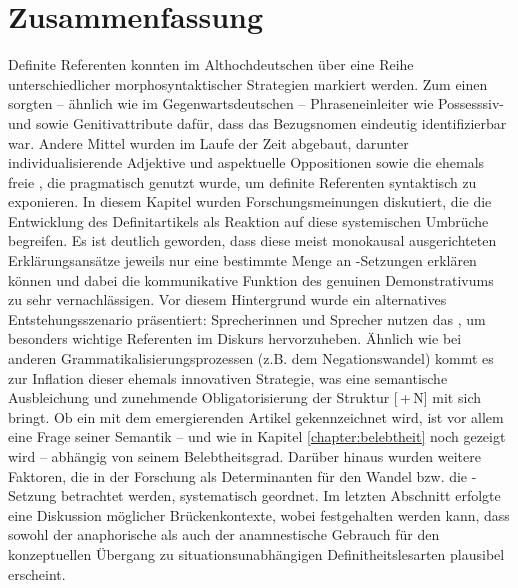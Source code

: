 \section{Zusammenfassung}
Definite Referenten konnten im Althochdeutschen über eine Reihe unterschiedlicher morphosyntaktischer Strategien markiert werden. Zum einen sorgten -- ähnlich wie im Gegenwartsdeutschen -- Phraseneinleiter wie Possesssiv-  und  sowie Genitivattribute  dafür, dass das Bezugsnomen eindeutig identifizierbar war. Andere Mittel wurden im Laufe der Zeit abgebaut, darunter individualisierende Adjektive  und aspektuelle  Oppositionen sowie die ehemals freie , die pragmatisch genutzt wurde, um definite Referenten syntaktisch zu exponieren. In diesem Kapitel wurden Forschungsmeinungen diskutiert, die die Entwicklung des Definitartikels  als Reaktion auf diese systemischen Umbrüche begreifen. Es ist deutlich geworden, dass diese meist monokausal ausgerichteten Erklärungsansätze jeweils nur eine bestimmte Menge an -Setzungen erklären können und dabei die kommunikative Funktion des genuinen Demonstrativums  zu sehr vernachlässigen. Vor diesem Hintergrund wurde ein alternatives Entstehungsszenario präsentiert: Sprecherinnen und Sprecher nutzen das , um besonders wichtige Referenten im Diskurs hervorzuheben. Ähnlich wie bei anderen Grammatikalisierungsprozessen  (z.B. dem Negationswandel) kommt es zur Inflation dieser ehemals innovativen Strategie, was eine semantische Ausbleichung und zunehmende Obligatorisierung der Struktur [\,+\,N] mit sich bringt. Ob ein  mit dem emergierenden Artikel gekennzeichnet wird, ist vor allem eine Frage seiner Semantik -- und wie in Kapitel \ref{chapter:belebtheit} noch gezeigt wird -- abhängig von seinem  Belebtheitsgrad. Darüber hinaus wurden weitere Faktoren, die in der Forschung als Determinanten für den Wandel bzw. die -Setzung betrachtet werden, systematisch geordnet. Im letzten Abschnitt erfolgte eine Diskussion möglicher  Brückenkontexte, wobei festgehalten werden kann, dass sowohl der anaphorische  als auch der anamnestische  Gebrauch für den konzeptuellen Übergang zu situationsunabhängigen Definitheitslesarten   plausibel erscheint. 

